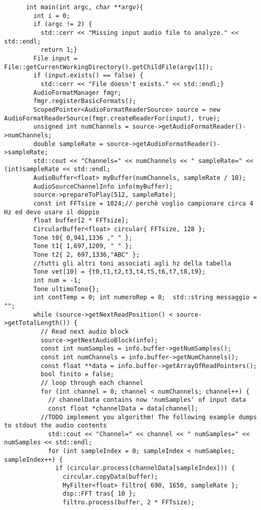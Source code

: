 \documentclass[8pt,a4paper]{article}
\begin{document}
\begin{multicols}{5}
\begin{verbatim}
      int main(int argc, char **argv){
        int i = 0;  
        if (argc != 2) {
          std::cerr << "Missing input audio file to analyze." << std::endl;
          return 1;}
        File input = File::getCurrentWorkingDirectory().getChildFile(argv[1]);
        if (input.exists() == false) {
          std::cerr << "File doesn't exists." << std::endl;}
        AudioFormatManager fmgr;
        fmgr.registerBasicFormats();
        ScopedPointer<AudioFormatReaderSource> source = new AudioFormatReaderSource(fmgr.createReaderFor(input), true);
        unsigned int numChannels = source->getAudioFormatReader()->numChannels;
        double sampleRate = source->getAudioFormatReader()->sampleRate;
        std::cout << "Channels=" << numChannels << " sampleRate=" << (int)sampleRate << std::endl;
        AudioBuffer<float> myBuffer(numChannels, sampleRate / 10);
        AudioSourceChannelInfo info(myBuffer);
        source->prepareToPlay(512, sampleRate);
        const int FFTsize = 1024;// perchè voglio campionare circa 4 Hz ed devo usare il doppio
        float buffer[2 * FFTsize];
        CircularBuffer<float> circular{ FFTsize, 128 };
        Tone t0{ 0,941,1336 ," " };
        Tone t1{ 1,697,1209, " " };
        Tone t2{ 2, 697,1336,"ABC" };
        //tutti gli altri toni associati agli hz della tabella
        Tone vet[10] = {t0,t1,t2,t3,t4,t5,t6,t7,t8,t9};
        int num = -1;
        Tone ultimoTono{};
        int contTemp = 0; int numeroRep = 0;  std::string messaggio = "";
        while (source->getNextReadPosition() < source->getTotalLength()) {
          // Read next audio block
          source->getNextAudioBlock(info);
          const int numSamples = info.buffer->getNumSamples();
          const int numChannels = info.buffer->getNumChannels();
          const float **data = info.buffer->getArrayOfReadPointers();
          bool finito = false;
          // loop through each channel
          for (int channel = 0; channel < numChannels; channel++) {
            // channelData contains now 'numSamples' of input data
            const float *channelData = data[channel];
          //TODO implement you algorithm! The following example dumps to stdout the audio contents
            std::cout << "Channel=" << channel << " numSamples=" << numSamples << std::endl;
            for (int sampleIndex = 0; sampleIndex < numSamples; sampleIndex++) {
              if (circular.process(channelData[sampleIndex])) {
                circular.copyData(buffer);
                MyFilter<float> filtro{ 690, 1650, sampleRate };
                dsp::FFT tras{ 10 };
                filtro.process(buffer, 2 * FFTsize);

\end{verbatim}
\end{multicols}
\end{document}
